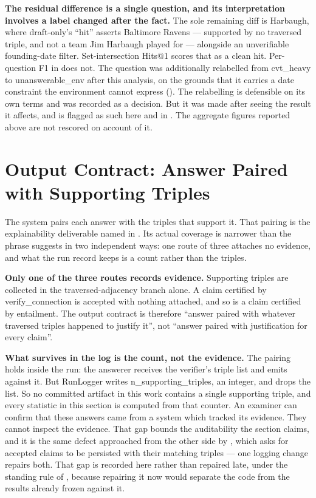 \textbf{The residual difference is a single question, and its interpretation
involves a label changed after the fact.} The sole remaining diff is Harbaugh,
where draft-only's ``hit'' asserts Baltimore Ravens --- supported by no
traversed triple, and not a team Jim Harbaugh played for --- alongside an
unverifiable founding-date filter. Set-intersection Hits@1 scores that as a
clean hit. Per-question F1 in  does not. The question was
additionally relabelled from \textsf{cvt\_heavy} to \textsf{unanswerable\_env}
after this analysis, on the grounds that it carries a date constraint the
environment cannot express (). The relabelling is
defensible on its own terms and was recorded as a decision. But it was made
after seeing the result it affects, and is flagged as such here and in
. The aggregate figures reported above are not rescored on
account of it.

\section{Output Contract: Answer Paired with Supporting
Triples}\label{sec:output-contract}

The system pairs each answer with the triples that support it. That pairing is
the explainability deliverable named in . Its actual
coverage is narrower than the phrase suggests in two independent ways: one
route of three attaches no evidence, and what the run record keeps is a count
rather than the triples.

\textbf{Only one of the three routes records evidence.} Supporting triples are
collected in the traversed-adjacency branch alone. A claim certified by
\textsf{verify\_connection} is accepted with nothing attached, and so is a claim
certified by entailment. The output contract is therefore ``answer paired with
whatever traversed triples happened to justify it'', not ``answer paired with
justification for every claim''.

\textbf{What survives in the log is the count, not the evidence.} The pairing
holds inside the run: the answerer receives the verifier's triple list and emits
against it. But \textsf{RunLogger} writes \textsf{n\_supporting\_triples}, an
integer, and drops the list. So no committed artifact in this work contains a
single supporting triple, and every statistic in this section is computed from
that counter. An examiner can confirm that these answers came from a system
which tracked its evidence. They cannot inspect the evidence. That gap bounds
the auditability the section claims, and it is the same defect approached from
the other side by , which asks for accepted claims to
be persisted with their matching triples --- one logging change repairs both.
That gap is recorded here rather than repaired late, under the standing rule
of , because repairing it now would separate the
code from the results already frozen against it.

